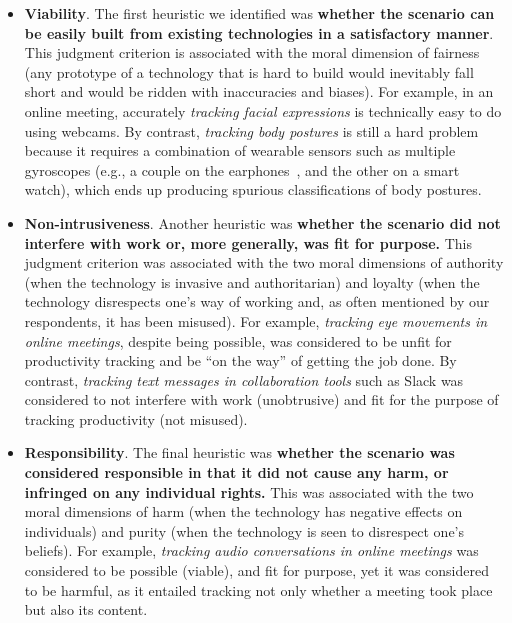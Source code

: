 \begin{itemize}

    \item[] \textbf{Viability}. The first heuristic we identified was \textbf{whether the scenario can be easily built from existing technologies in a satisfactory manner}. This judgment criterion is associated with the moral dimension of fairness (any prototype of a technology that is hard to build would inevitably fall short and would be ridden with inaccuracies and biases). For example, in an online meeting, accurately \emph{tracking facial expressions} is technically easy to do using webcams. By contrast, \emph{tracking body postures} is still a hard problem because it requires a combination of wearable sensors such as multiple gyroscopes (e.g., a couple on the earphones~\cite{choi2021kairos, kawsar2018earables}, and the other on a smart watch), which ends up producing spurious classifications of body postures. \\

    \item[] \textbf{Non-intrusiveness}. Another heuristic was \textbf{whether the scenario did not interfere with work or, more generally, was fit for purpose.} This judgment criterion was associated with the two moral dimensions of authority (when the technology is invasive and authoritarian) and loyalty (when the technology disrespects one's way of working and, as often mentioned by our respondents, it has been misused). For example, \emph{tracking eye movements in online meetings}, despite being possible, was considered to be unfit for productivity tracking and be ``on the way'' of getting the job done. By contrast, \emph{tracking text messages in collaboration tools} such as Slack was considered to not interfere with work (unobtrusive) and fit for the purpose of tracking productivity (not misused). \\

    \item[]  \textbf{Responsibility}. The final heuristic was \textbf{whether the scenario was considered responsible in that it did not cause any harm, or infringed on any individual rights.} This was associated with the two moral dimensions of harm (when the technology has negative effects on individuals) and purity (when the technology is seen to disrespect one's beliefs). For example, \emph{tracking audio conversations in online meetings} was considered to be possible (viable), and fit for purpose, yet it was considered to be harmful, as it entailed tracking not only whether a meeting took place but also its content.

\end{itemize}

